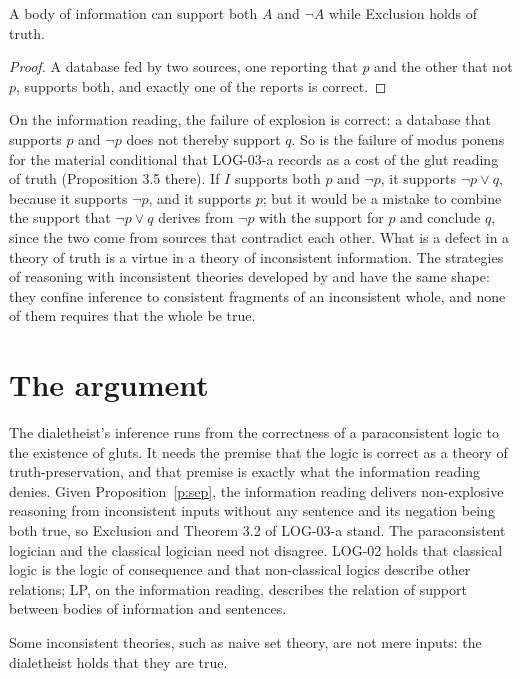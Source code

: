 \documentclass{situationist-preprint}
\begin{document}
\begin{proposition}\label{p:sep}
A body of information can support both $A$ and $\neg A$ while Exclusion holds of truth.
\end{proposition}

\begin{proof}
A database fed by two sources, one reporting that $p$ and the other that not $p$, supports both, and exactly one of the reports is correct.
\end{proof}

On the information reading, the failure of explosion is correct: a database that supports $p$ and $\neg p$ does not thereby support $q$. So is the failure of modus ponens for the material conditional that LOG-03-a records as a cost of the glut reading of truth (Proposition 3.5 there). If $I$ supports both $p$ and $\neg p$, it supports $\neg p \vee q$, because it supports $\neg p$, and it supports $p$; but it would be a mistake to combine the support that $\neg p \vee q$ derives from $\neg p$ with the support for $p$ and conclude $q$, since the two come from sources that contradict each other. What is a defect in a theory of truth is a virtue in a theory of inconsistent information. The strategies of reasoning with inconsistent theories developed by \citet{SchotchJennings1980} and \citet{BrownPriest2004} have the same shape: they confine inference to consistent fragments of an inconsistent whole, and none of them requires that the whole be true.

\section{The argument}

The dialetheist's inference runs from the correctness of a paraconsistent logic to the existence of gluts. It needs the premise that the logic is correct as a theory of truth-preservation, and that premise is exactly what the information reading denies. Given Proposition~\ref{p:sep}, the information reading delivers non-explosive reasoning from inconsistent inputs without any sentence and its negation being both true, so Exclusion and Theorem 3.2 of LOG-03-a stand. The paraconsistent logician and the classical logician need not disagree. LOG-02 holds that classical logic is the logic of consequence and that non-classical logics describe other relations; LP, on the information reading, describes the relation of support between bodies of information and sentences.

\begin{objection}
Some inconsistent theories, such as naive set theory, are not mere inputs: the dialetheist holds that they are true.
\end{objection}
\end{document}
